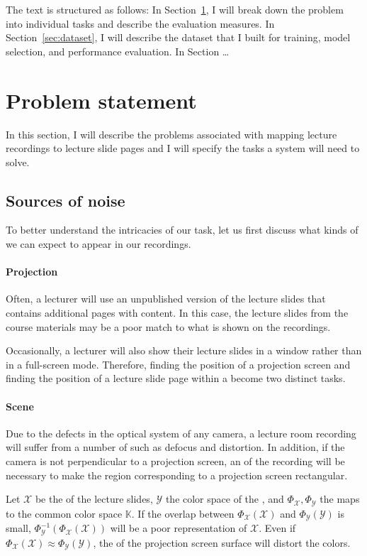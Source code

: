 The text is structured as follows: In Section~\ref{sec:problem}, I will
break down the problem into individual tasks and describe the evaluation
measures. In Section~\ref{sec:dataset}, I will describe the dataset
that I built for training, model selection, and performance evaluation.
In Section …

\section{Problem statement}
\label{sec:problem}
In this section, I will describe the problems associated with mapping lecture
recordings to lecture slide pages and I will specify the tasks a system will
need to solve.

\subsection{Sources of noise}
\label{sec:noise}
To better understand the intricacies of our task, let us first discuss what
kinds of  we can expect to appear in our recordings.

\paragraph{Projection} Often, a lecturer will use an unpublished version of the
lecture slides that contains additional pages with 
content. In this case, the lecture slides from the course materials may be a
poor match to what is shown on the recordings.

Occasionally, a lecturer will also show their lecture slides in a window rather
than in a full-screen mode. Therefore, finding the position of a projection
screen and finding the position of a lecture slide page within a
 become two distinct tasks.

\paragraph{Scene} Due to the defects in the optical system of any camera, a
lecture room recording will suffer from a number of  such as
defocus and distortion. In addition, if the camera is not perpendicular to a
projection screen, an  of the recording
will be necessary to make the region corresponding to a projection screen
rectangular.

Let $\mathcal X$ be the  of the lecture slides, $\mathcal Y$
the color space of the , and $\Phi_{\mathcal X},\Phi_{\mathcal
Y}$ the maps to the common color space $\mathbb K$. If the overlap between
$\Phi_{\mathcal X}(\mathcal X)$ and $\Phi_{\mathcal Y}(\mathcal Y)$ is small,
$\Phi^{-1}_{\mathcal Y}(\Phi_{\mathcal X}(\mathcal X))$ will be a poor
representation of $\mathcal X$. Even if $\Phi_{\mathcal X}(\mathcal
X)\approx\Phi_{\mathcal Y}(\mathcal Y)$, the  of the
projection screen surface will distort the colors.

